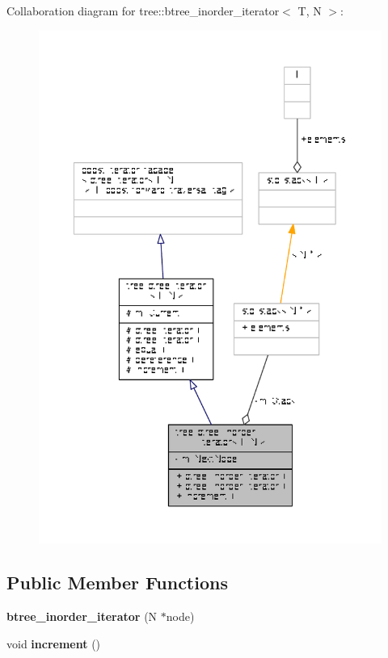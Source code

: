 Collaboration diagram for tree\-:\-:btree\-\_\-inorder\-\_\-iterator$<$ T, N $>$\-:
\nopagebreak
\begin{figure}[H]
\begin{center}
\leavevmode
\includegraphics[width=350pt]{classtree_1_1btree__inorder__iterator__coll__graph}
\end{center}
\end{figure}
\subsection*{Public Member Functions}
\begin{DoxyCompactItemize}
\item 
\hypertarget{classtree_1_1btree__inorder__iterator_abb3121aadd921041e0af5a28d527eaf2}{{\bfseries btree\-\_\-inorder\-\_\-iterator} (N $\ast$node)}\label{classtree_1_1btree__inorder__iterator_abb3121aadd921041e0af5a28d527eaf2}

\item 
\hypertarget{classtree_1_1btree__inorder__iterator_ae42f42822641ec3d55e2e570f9e0d897}{void {\bfseries increment} ()}\label{classtree_1_1btree__inorder__iterator_ae42f42822641ec3d55e2e570f9e0d897}

\end{DoxyCompactItemize}
